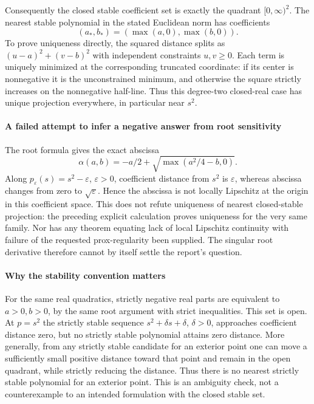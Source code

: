 \documentclass[11pt]{article}
\begin{document}
Consequently the closed stable coefficient set is exactly the quadrant $[0,\infty)^2$. The nearest stable polynomial in the stated Euclidean norm has coefficients
\[
 (a_*,b_*)=(\max(a,0),\max(b,0)).
\]
To prove uniqueness directly, the squared distance splits as $(u-a)^2+(v-b)^2$ with independent constraints $u,v\geq0$. Each term is uniquely minimized at the corresponding truncated coordinate: if its center is nonnegative it is the unconstrained minimum, and otherwise the square strictly increases on the nonnegative half-line. Thus this degree-two closed-real case has unique projection everywhere, in particular near $s^2$.

\paragraph{A failed attempt to infer a negative answer from root sensitivity}
The root formula gives the exact abscissa
\[
 \alpha(a,b)=-a/2+\sqrt{\max(a^2/4-b,0)}.
\]
Along $p_\varepsilon(s)=s^2-\varepsilon$, $\varepsilon>0$, coefficient distance from $s^2$ is $\varepsilon$, whereas abscissa changes from zero to $\sqrt\varepsilon$. Hence the abscissa is not locally Lipschitz at the origin in this coefficient space. This does not refute uniqueness of nearest closed-stable projection: the preceding explicit calculation proves uniqueness for the very same family. Nor has any theorem equating lack of local Lipschitz continuity with failure of the requested prox-regularity been supplied. The singular root derivative therefore cannot by itself settle the report's question.

\paragraph{Why the stability convention matters}
For the same real quadratics, strictly negative real parts are equivalent to $a>0,b>0$, by the same root argument with strict inequalities. This set is open. At $p=s^2$ the strictly stable sequence $s^2+\delta s+\delta$, $\delta>0$, approaches coefficient distance zero, but no strictly stable polynomial attains zero distance. More generally, from any strictly stable candidate for an exterior point one can move a sufficiently small positive distance toward that point and remain in the open quadrant, while strictly reducing the distance. Thus there is no nearest strictly stable polynomial for an exterior point. This is an ambiguity check, not a counterexample to an intended formulation with the closed stable set.
\end{document}
